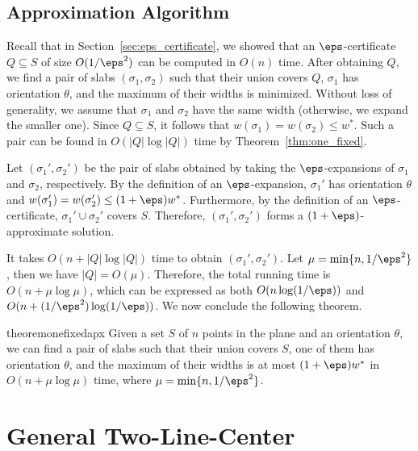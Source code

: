 \subsection{Approximation Algorithm}
\label{sec:one_fixed_approximation}

Recall that in Section~\ref{sec:eps_certificate}, we showed that an $\eps$-certificate $Q \subseteq S$ of size $O(1/\eps^2)$ can be computed in $O(n)$ time. 
After obtaining $Q$, we find a pair of slabs $(\sigma_1, \sigma_2)$ such that their union covers $Q$, $\sigma_1$ has orientation $\theta$, and the maximum of their widths is minimized.
Without loss of generality, we assume that $\sigma_1$ and $\sigma_2$ have the same width (otherwise, we expand the smaller one).
Since $Q \subseteq S$, it follows that $w(\sigma_1) = w(\sigma_2) \le w^*$. 
Such a pair can be found in $O(|Q|\log |Q|)$ time by Theorem~\ref{thm:one_fixed}. 

Let $(\sigma_1', \sigma_2')$ be the pair of slabs obtained by taking the $\eps$-expansions of $\sigma_1$ and $\sigma_2$, respectively. 
By the definition of an $\eps$-expansion, $\sigma_1'$ has orientation $\theta$ and $w(\sigma_1')= w(\sigma_2') \le (1+\eps)w^*$. 
Furthermore, by the definition of an $\eps$-certificate, $\sigma_1' \cup \sigma_2'$ covers $S$. 
Therefore, $(\sigma_1', \sigma_2')$ forms a $(1+\eps)$-approximate solution. 

It takes $O(n + |Q|\log |Q|)$ time to obtain $(\sigma_1', \sigma_2')$. 
Let $\mu = \min \{n, 1/\eps^2\}$, then we have $|Q| = O(\mu)$. 
Therefore, the total running time is $O(n + \mu \log \mu)$, which can be expressed as both $O(n \log (1/\eps))$ and $O(n + (1/\eps^2) \log (1/\eps))$. 
We now conclude the following theorem.




\begin{restatable}{theorem}{onefixedapx}
    \label{thm:one_fixed_apx}
    Given a set $S$ of $n$ points in the plane and an orientation $\theta$, we can find a pair of slabs such that their union covers $S$, one of them has orientation $\theta$, and the maximum of their widths is at most $(1+\eps)w^*$ in $O(n+ \mu\log \mu)$ time, where $\mu = \min \{n, 1/\eps^2\}$.  
\end{restatable}



\section{General Two-Line-Center}
\label{sec:general}

